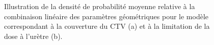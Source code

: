 \begin{figure}[ht!]
  \centering
  \hspace{0.5cm}
\caption{\label{DensiteProba} Illustration de la densité de probabilité moyenne relative à la combinaison linéaire des paramètres géométriques pour le modèle correspondant à la couverture du CTV (a) et à la limitation de la dose à l'urètre (b).}
\end{figure}
%
